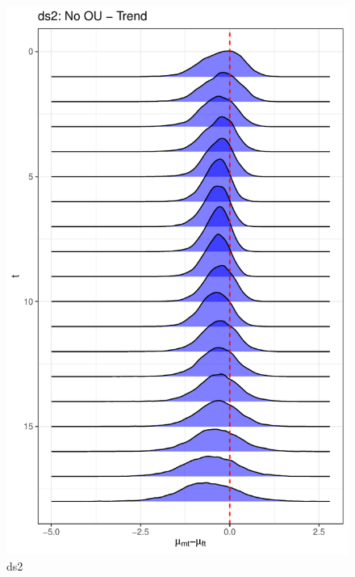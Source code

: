 \documentclass[
  12pt,
]{article}
\begin{document}
\begin{figure}

{\centering \includegraphics[width=0.9\linewidth]{../Figures/ds2/mu_diff} 

}

\caption{ds2}\label{fig:unnamed-chunk-8}
\end{figure}
\end{document}
